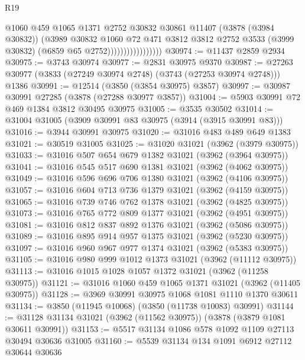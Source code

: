 \begin{lexlean}{R19}
\begin{coremodule}
                                  @1060
                                  @459
                                  @1065
                                  @1371
                                  @2752
                                  @30832
                                  @30861
                                  @11407
                                  (@3878 (@3984 @30832))
                                  (@3989
                                    @30832
                                    @1060
                                    @72
                                    @471
                                    @3812
                                    @3812
                                    @2752
                                    @3533
                                    (@3999 @30832)
                                    (@6859 @65 @2752)))))))))))))))))
@30974 := @11437 @2859 @2934
@30975 := @3743 @30974
@30977 := @2831 @30975 @9370
@30987 := @27263 @30977 (@3833 (@27249 @30974 @2748) (@3743 (@27253 @30974 @2748))) @1386
@30991 := @12514 (@3850 (@3854 @30975) @3857)
@30997 := @30987 @30991 @27285 (@3878 (@27288 @30977 @3857))
@31004 := @5903 @30991 @72 @469 @1384 @3812 @30495 @30975
@31005 := @3535 @30502
@31014 := @31004 @31005 (@3909 @30991 @83 @30975 (@3914 (@3915 @30991 @83)))
@31016 := @3944 @30991 @30975
@31020 := @31016 @483 @489 @649 @1383
@31021 := @30519 @31005
@31025 := @31020 @31021 (@3962 (@3979 @30975))
@31033 := @31016 @507 @654 @679 @1382 @31021 (@3962 (@3964 @30975))
@31041 := @31016 @545 @517 @690 @1381 @31021 (@3962 (@4062 @30975))
@31049 := @31016 @596 @696 @706 @1380 @31021 (@3962 (@4106 @30975))
@31057 := @31016 @604 @713 @736 @1379 @31021 (@3962 (@4159 @30975))
@31065 := @31016 @739 @746 @762 @1378 @31021 (@3962 (@4825 @30975))
@31073 := @31016 @765 @772 @809 @1377 @31021 (@3962 (@4951 @30975))
@31081 := @31016 @812 @837 @892 @1376 @31021 (@3962 (@5086 @30975))
@31089 := @31016 @895 @914 @957 @1375 @31021 (@3962 (@5230 @30975))
@31097 := @31016 @960 @967 @977 @1374 @31021 (@3962 (@5383 @30975))
@31105 := @31016 @980 @999 @1012 @1373 @31021 (@3962 (@11112 @30975))
@31113 := @31016 @1015 @1028 @1057 @1372 @31021 (@3962 (@11258 @30975))
@31121 := @31016 @1060 @459 @1065 @1371 @31021 (@3962 (@11405 @30975))
@31128 := @3969 @30991 @30975 @1068 @1081 @1110 @1370 @30611
@31134 := @3850 (@11945 @10068) (@3850 (@11738 @10083) @30991)
@31144 := @31128 @31134 @31021 (@3962 (@11562 @30975)) (@3878 (@3879 @1081 @30611 @30991))
@31153 := @5517 @31134 @1086 @578 @1092 @1109 @27113 @30494 @30636 @31005
@31160 := @5539 @31134 @134 @1091 @6912 @27112 @30644 @30636

\end{coremodule}
\end{lexlean}
